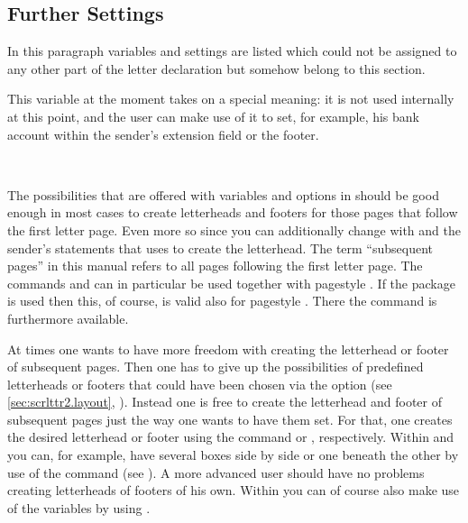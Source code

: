 \subsection{Further Settings}
\label{sec:scrlttr2.other}
In this paragraph variables and settings are listed which could not be
assigned to any other part of the letter declaration but somehow
belong to this section.


\begin{Declaration}
\end{Declaration}
%
This variable at the moment takes on a special meaning: it is not used
internally at this point, and the user can make use of it to set, for
example, his bank account within the sender's extension field or the
footer.
%
%


\begin{Declaration}
  \\
\end{Declaration}
%
%
The possibilities that are offered with variables and options in
 should be good enough in most cases to create
letterheads and footers for those pages that follow the first letter
page. Even more so since you can additionally change with
 and  the sender's statements that
 uses to create the letterhead. The term ``subsequent
pages'' in this manual refers to all pages following the first letter
page. The commands  and
 can in particular be used
together with pagestyle
. If the package
 is used then this, of
course, is valid also for pagestyle
. There the command
 is furthermore available.

At times one wants to have more freedom with creating the letterhead
or footer of subsequent pages. Then one has to give up the
possibilities of predefined letterheads or footers that could have
been chosen via the option 
(see \autoref{sec:scrlttr2.layout},
). Instead one is free to
create the letterhead and footer of subsequent pages just the way one
wants to have them set. For that, one creates the desired letterhead
or footer  using the command  or
, respectively. Within  and
 you can, for example, have several boxes side by side
or one beneath the other by use of the  command (see
\cite{latex:usrguide}). A more advanced user should have no problems
creating letterheads of footers of his own.  Within
 you can of course also make use of the variables
by using .
%
%
%


